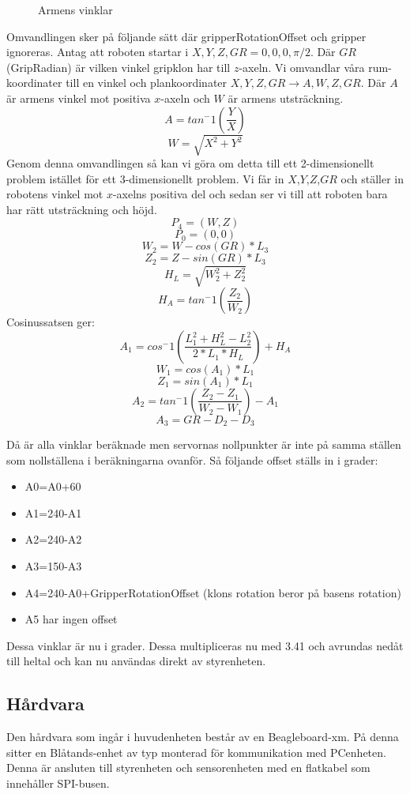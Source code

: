\begin{figure}[h!]
    \centerline{}
    \caption{Armens vinklar}
\end{figure}

Omvandlingen sker på följande sätt där gripperRotationOffset och gripper ignoreras. Antag att roboten startar i $X,Y,Z,GR=0,0,0,\pi/2$.
Där $GR$(GripRadian) är vilken vinkel gripklon har till $z$-axeln.\newline
Vi omvandlar våra rum-koordinater till en vinkel och plankoordinater $X,Y,Z,GR\rightarrow A,W,Z,GR$. Där $A$ är armens vinkel mot positiva $x$-axeln och $W$ är armens utsträckning.
$$A=tan^-1(\dfrac{Y}{X}) $$
$$W=\sqrt{X^2+Y^2}$$
Genom denna omvandlingen så kan vi göra om detta till ett 2-dimensionellt problem istället för ett 3-dimensionellt problem. Vi får in $X$,$Y$,$Z$,$GR$ och ställer in robotens vinkel mot $x$-axelns positiva del och sedan ser vi till att roboten bara har rätt utsträckning och höjd.
$$P_4=(W,Z)$$
$$P_0=(0,0)$$
$$W_2=W-cos(GR)*L_3$$
$$Z_2=Z-sin(GR)*L_3$$
$$H_L=\sqrt{W_2^2+Z_2^2}$$
$$H_A=tan^-1(\dfrac{Z_2}{W_2})$$
Cosinussatsen ger:
$$A_1=cos^-1(\dfrac{L_1^2+H_L^2-L_2^2}{2*L_1*H_L})+H_A$$
$$W_1=cos(A_1)*L_1$$
$$Z_1=sin(A_1)*L_1$$
$$A_2=tan^-1(\dfrac{Z_2-Z_1}{W_2-W_1})-A_1$$
$$A_3=GR-D_2-D_3$$

Då är alla vinklar beräknade men servornas nollpunkter är inte på samma ställen som nollställena i beräkningarna ovanför. Så följande offset ställs in i grader:
\begin{itemize}
\item A0=A0+60
\item A1=240-A1
\item A2=240-A2
\item A3=150-A3
\item A4=240-A0+GripperRotationOffset (klons rotation beror på basens rotation)
\item A5 har ingen offset
\end{itemize}
Dessa vinklar är nu i grader. Dessa multipliceras nu med 3.41 och avrundas nedåt till heltal och kan nu användas direkt av styrenheten.
\subsection{Hårdvara}
Den hårdvara som ingår i huvudenheten består av en Beagleboard-xm. På denna sitter en Blåtands-enhet av typ  monterad för kommunikation med PCenheten. Denna är ansluten till styrenheten och sensorenheten med en flatkabel som innehåller SPI-busen.

